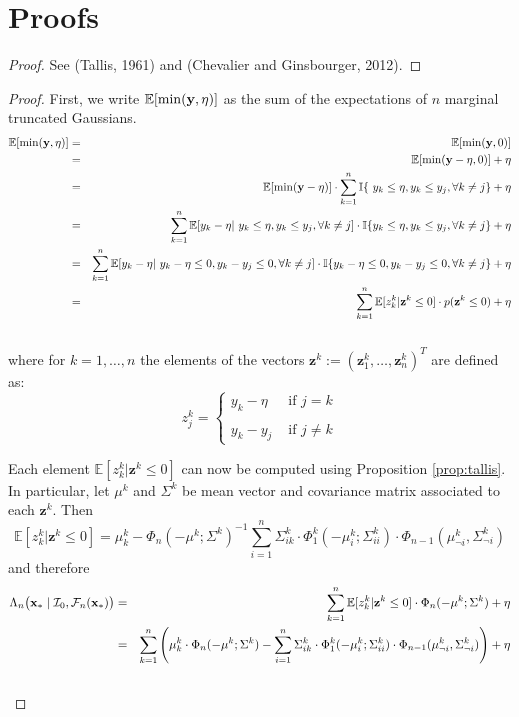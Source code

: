\documentclass{article} %
\newcommand{\I}{\mathcal{I}}
\newcommand{\E}{\mathbb{E}}
\newcommand{\future}{\mathcal{F}}
\newcommand{\ind}{\mathbb{I}}
\newcommand{\bz}{\textbf{z}}
\newtheorem{proof}{Proof}
\begin{document}
\section{Proofs}

\begin{proof}
See (Tallis, 1961) and (Chevalier and Ginsbourger, 2012).
\end{proof}


\begin{proof}
First, we write $\E [\min (\dataVector,\eta)]$ as the sum of the expectations of $n$ marginal truncated Gaussians. 
\begin{eqnarray}\label{eq:expected_loss_oracle} \nonumber
\E [\min (\dataVector,\eta)] & = & \E [\min (\dataVector,0)] \\  \nonumber
 & = & \E [\min (\dataVector-\eta,0)] +\eta\\  \nonumber
 & = & \E [\min (\dataVector-\eta)] \cdot \sum_{k=1}^n\ind\{\ y_k\leq \eta,  y_k\leq y_j, \forall k\neq j  \} +  \eta\\  \nonumber
 & = & \sum_{k=1}^n\E [y_k-\eta|\ y_k\leq \eta,  y_k\leq y_j, \forall k\neq j ] \cdot \ind\{y_k\leq \eta,  y_k\leq y_j, \forall k\neq j  \} +  \eta\\  \nonumber
 &  = & \sum_{k=1}^n\E [y_k-\eta|\ y_k - \eta \leq 0 ,  y_k - y_j\leq 0 , \forall k\neq j ] \cdot \ind\{y_k - \eta \leq 0 ,  y_k - y_j\leq 0, \forall k\neq j  \} +  \eta\\ 
 &  = & \sum_{k=1}^n\E [ z^k_k|\bz^k \leq 0] \cdot p(\bz^k \leq 0) +  \eta\\ 
   \nonumber
\end{eqnarray}
where for $k=1,\dots,n$ the elements of the vectors $\bz^k:= (\bz^k_1,\dots,\bz^k_n)^T$ are defined as:
$$z_j^k= \left\{ \begin{array}{lcl}
y_k - \eta & \mbox{ if } j=k \\
  \\
y_k - y_j  &   \mbox{ if } j \neq k
\end{array}
\right.$$

Each element $\E [ z^k_k|\bz^k \leq 0]$ can now be computed using Proposition \ref{prop:tallis}. In particular, let $\mu^k$ and $\Sigma^k$ be mean vector and covariance matrix associated to each $\bz^k$. Then 
$$\E [ z^k_k|\bz^k \leq 0]  = \mu^k_k -  \Phi_n ( -\mu^k; \Sigma^k)^{-1} \sum_{i=1}^n \Sigma^k_{ik} \cdot \Phi^k_1(-\mu^k_i;\Sigma^k_{ii}) \cdot \Phi_{n-1}(\mu^k_{\neg i}, \Sigma^k_{\neg i}) $$
and therefore
\begin{eqnarray}\nonumber
\Lambda_n \bigl(\latentVector_* \mid \I_0, \future_{n}(\latentVector_*) \bigr) & = &   \sum_{k=1}^n\E [ z^k_k|\bz^k \leq 0] \cdot \Phi_n ( -\mu^k; \Sigma^k) +  \eta\\  \nonumber
& = &\sum_{k=1}^n \left(  \mu^k_k \cdot \Phi_n ( -\mu^k; \Sigma^k) -  \sum_{i=1}^n \Sigma^k_{ik} \cdot \Phi^k_1(-\mu^k_i;\Sigma^k_{ii}) \cdot \Phi_{n-1}(\mu^k_{\neg i}, \Sigma^k_{\neg i}) \right) + \eta \\ \nonumber
\end{eqnarray}


\end{proof}
\end{document}

